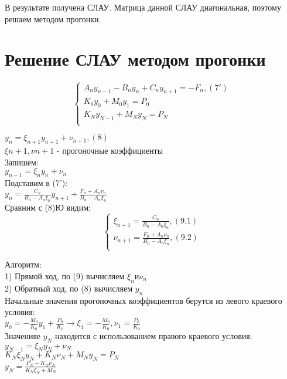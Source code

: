 В результате получена СЛАУ. Матрица данной СЛАУ диагональная, поэтому решаем методом прогонки.

\section{Решение СЛАУ методом прогонки}
\begin{equation}
\begin{cases}
A_{n} y_{n-1} - B_{n}y_{n} + C_{n}y_{n+1} = -F_{n}, (7')\\
K_{0} y_{0} + M_{0} y_{1} = P_{0}\\
K_{N} y_{N - 1} + M_{N} y_{N} = P_{N}\\
\end{cases}
\end{equation}

$y_{n} = \xi_{n+1} y_{n+1} + \nu_{n+1}, (8)$\\
$\xi{n+1}, \nu{n+1}$ - прогоночные коэффициенты\\
Запишем:\\
$y_{n-1} = \xi_{n} y_{n} + \nu_{n}$\\
Подставим в (7'):\\
$y_{n} = \frac{C_{n}}{B_{n} - A_{n}\xi_{n}} y_{n+1} + \frac{F_{n} + A_{n} \nu_{n}}{B_{n} - A_{n} \xi_{n}}$\\
Сравним с (8)Ю видим:\\
\begin{equation}
\begin{cases}
\xi_{n+1} = \frac{C_{n}}{B_{n} - A_{n} \xi_{n}}, (9.1)\\
\nu_{n+1} = \frac{F_{n} + A_{n} \nu_{n}}{B_{n} - A_{n} \xi_{n}}, (9.2)\\
\end{cases}
\end{equation}

Алгоритм:\\
1) Прямой ход, по (9) вычисляем $\xi_{n} и \nu_{n}$\\
2) Обратный ход, по (8) вычисляем $y_{n}$\\

Начальные значения прогоночных коэффициентов берутся из левого краевого условия:\\
$y_{0} = -\frac{M_{0}}{K_{0}}y_{1} + \frac{P_{0}}{K_{0}} \rightarrow \xi_{1} = -\frac{M_{0}}{K_{0}}, \nu_{1} = \frac{P_{0}}{K_{0}}$\\

Значенияе $y_{N}$ находится с использованием правого краевого условия:\\
$y_{N - 1}  = \xi_{N} y_{N} + \nu_{N}$\\
$K_{N} \xi_{N} y_{N} + K_{N} \nu_{N} + M_{N} y_{N} = P_{N}$\\
$y_{N} = \frac{P_{N} - K_{N}\nu_{N}}{K_{N}\xi_{N} + M_{N}}$\\


